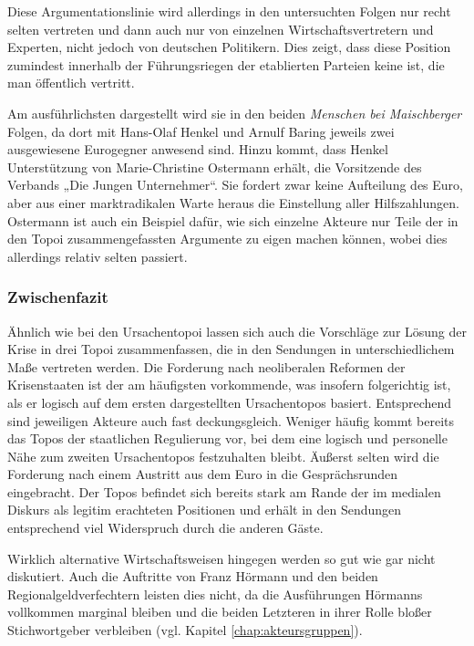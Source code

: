 Diese Argumentationslinie wird allerdings in den untersuchten Folgen nur recht selten vertreten und dann auch nur von einzelnen Wirtschaftsvertretern und Experten, nicht jedoch von deutschen Politikern. Dies zeigt, dass diese Position zumindest innerhalb der Führungsriegen der etablierten Parteien keine ist, die man öffentlich vertritt.

Am ausführlichsten dargestellt wird sie in den beiden \textit{Menschen bei Maischberger} Folgen, da dort mit Hans-Olaf Henkel und Arnulf Baring jeweils zwei ausgewiesene Eurogegner anwesend sind. Hinzu kommt, dass Henkel Unterstützung von Marie-Christine Ostermann erhält, die Vorsitzende des Verbands „Die Jungen Unternehmer“. Sie fordert zwar keine Aufteilung des Euro, aber aus einer marktradikalen Warte heraus die Einstellung aller Hilfszahlungen. Ostermann ist auch ein Beispiel dafür, wie sich einzelne Akteure nur Teile der in den Topoi zusammengefassten Argumente zu eigen machen können, wobei dies allerdings relativ selten passiert.

\subsubsection{Zwischenfazit}

Ähnlich wie bei den Ursachentopoi lassen sich auch die Vorschläge zur Lösung der Krise in drei Topoi zusammenfassen, die in den Sendungen in unterschiedlichem Maße vertreten werden. Die Forderung nach neoliberalen Reformen der Krisenstaaten ist der am häufigsten vorkommende, was insofern folgerichtig ist, als er logisch auf dem ersten dargestellten Ursachentopos basiert. Entsprechend sind jeweiligen Akteure auch fast deckungsgleich. Weniger häufig kommt bereits das Topos der staatlichen Regulierung vor, bei dem eine logisch und personelle Nähe zum zweiten Ursachentopos festzuhalten bleibt. Äußerst selten wird die Forderung nach einem Austritt aus dem Euro in die Gesprächsrunden eingebracht. Der Topos befindet sich bereits stark am Rande der im medialen Diskurs als legitim erachteten Positionen und erhält in den Sendungen entsprechend viel Widerspruch durch die anderen Gäste.

Wirklich alternative Wirtschaftsweisen hingegen werden so gut wie gar nicht diskutiert. Auch die Auftritte von Franz Hörmann und den beiden Regionalgeldverfechtern leisten dies nicht, da die Ausführungen Hörmanns vollkommen marginal bleiben und die beiden Letzteren in ihrer Rolle bloßer Stichwortgeber verbleiben (vgl. Kapitel \vref{chap:akteursgruppen}).

